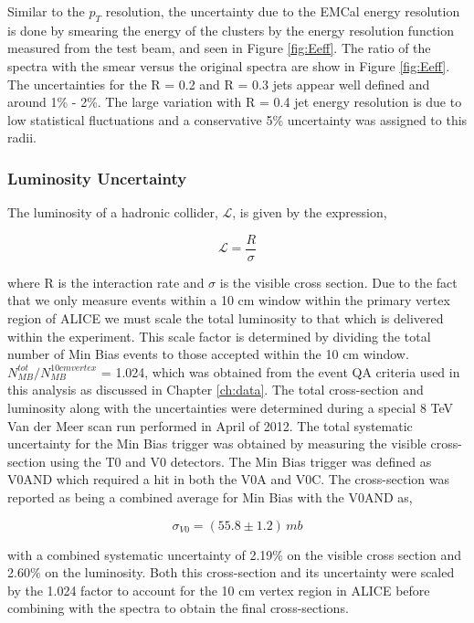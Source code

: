 Similar to the $p_{T}$ resolution, the uncertainty due to the EMCal energy resolution is done by smearing the energy of the clusters by the energy resolution function measured from the test beam, and seen in Figure \ref{fig:Eeff}.  The ratio of the spectra with the smear versus the original spectra are show in Figure \ref{fig:Eeff}. The uncertainties for the R = 0.2 and R = 0.3 jets appear well defined and around 1\% - 2\%.  The large variation with R = 0.4 jet energy resolution is due to low statistical fluctuations and a conservative 5\% uncertainty was assigned to this radii.

\subsubsection{Luminosity Uncertainty}

The luminosity of a hadronic collider, $\mathscr{L}$, is given by the expression,



\begin{equation}
\mathscr{L} = \frac{R}{\sigma}
\label{eq:xlumdef}
\end{equation}

\noindent
where R is the interaction rate and $\sigma$ is the visible cross section.  Due to the fact that we only measure events within a 10 cm window within the primary vertex region of ALICE we must scale the total luminosity to that which is delivered within the experiment.  This scale factor is determined by dividing the total number of Min Bias events to those accepted within the 10 cm window.  $N^{tot}_{MB} / N^{10 cm vertex}_{MB}$ = 1.024, which was obtained from the event QA criteria used in this analysis as discussed in Chapter \ref{ch:data}.
The total cross-section and luminosity along with the uncertainties were determined during a special 8 TeV Van der Meer scan run performed in April of 2012\cite{ALICE-PUBLIC-2017-002}.  The total systematic uncertainty for the Min Bias trigger was obtained by measuring the visible cross-section using the T0 and V0 detectors.  The Min Bias trigger was defined as V0AND which required a hit in both the V0A and V0C.  The cross-section was reported as being a combined average for Min Bias with the V0AND as, 

\begin{equation}
\sigma_{V0} = (55.8 \pm 1.2) \, mb
\label{eq:xlumdef}
\end{equation}

\noindent
with a combined systematic uncertainty of 2.19\% on the visible cross section and 2.60\% on the luminosity.  Both this cross-section and its uncertainty were scaled by the 1.024 factor to account for the 10 cm vertex region in ALICE before combining with the spectra to obtain the final cross-sections.


